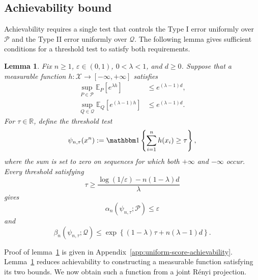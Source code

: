 \documentclass[journal,12pt,draftclsnofoot,onecolumn]{IEEEtran}
\newtheorem{lemma}{Lemma}
\begin{document}
\subsection{Achievability bound}
\label{sec:composite-achievability}

Achievability requires a single test that controls the Type I error uniformly over $\mathcal P$ and the Type II error uniformly over $\mathcal Q$. The following lemma gives sufficient conditions for a
threshold test to satisfy both requirements.

\begin{lemma}
\label{lem:uniform-score-achievability} Fix $n\geq1$, $\varepsilon\in(0,1)$, $0<\lambda<1$, and $d\geq0$. Suppose that a measurable function $h:\mathcal X\to[-\infty,+\infty]$ satisfies
\begin{equation*}
\begin{aligned}
\sup_{P\in\mathcal P}
\mathbb E_P\left[e^{\lambda h}\right]
&\leq
e^{(\lambda-1)d},
\\
\sup_{Q\in\mathcal Q}
\mathbb E_Q\left[e^{(\lambda-1)h}\right]
&\leq
e^{(\lambda-1)d}.
\end{aligned}
\end{equation*}
For $\tau\in\mathbb R$, define the threshold test
\begin{equation*}
\psi_{n,\tau}(x^n):=\mathbbm 1\left\{\sum_{i=1}^n h(x_i)\geq\tau\right\},
\end{equation*}
where the sum is set to zero on sequences for which both $+\infty$ and $-\infty$ occur. Every threshold satisfying
\begin{equation*}
\tau \geq \frac{\log(1/\varepsilon)-n(1-\lambda)d}{\lambda}
\end{equation*}
gives
\begin{equation*}
\alpha_n(\psi_{n,\tau};\mathcal P)\leq
\varepsilon\end{equation*} 
and
\begin{equation*}
\beta_n(\psi_{n,\tau};\mathcal Q) \leq\exp\left\{(1-\lambda)\tau+n(\lambda-1)d\right\}.
\end{equation*}
\end{lemma}
Proof of lemma~\ref{lem:uniform-score-achievability} is given in Appendix~\ref{app:uniform-score-achievability}. Lemma~\ref{lem:uniform-score-achievability} reduces achievability to constructing a measurable function satisfying its two bounds. We now obtain such a function from a joint R\'enyi projection.
\end{document}
